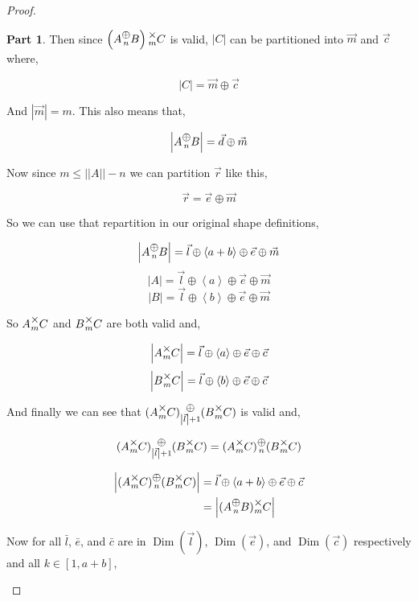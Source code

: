 \documentclass[12pt]{book}
\theoremstyle{plain}
\theoremstyle{definition}
\theoremstyle{ppart}
\newtheorem{ppart}{Part}
\theoremstyle{case}
\theoremstyle{solution}
\DeclareMathOperator{\Dim}{Dim}
\newcommand{\mmult}[1]{\text{\raisebox{1ex}{$\underset{#1}{\times}$}}}
\newcommand{\mconcat}[1]{\text{\raisebox{1ex}{$\underset{#1}{\oplus}$}}}
\newcommand{\shape}[1]{\left|#1\right|}
\begin{document}
\begin{proof}
\begin{ppart}
Then since $\left(A \mconcat{n} B\right) \mmult{m} C$ is valid, $\shape{C}$ can
be partitioned into $\vec{m}$ and $\vec{c}$ where,

\[ \shape{C} = \vec{m} \oplus \vec{c} \]

And $\shape{\vec{m}} = m$. This also means that,

\[ \shape{A \mconcat{n} B} = \vec{d} \oplus \vec{m} \]

Now since $m \le \shape{\shape{A}}-n$ we can partition $\vec{r}$ like this,

\[ \vec{r} = \vec{e} \oplus \vec{m} \]

So we can use that repartition in our original shape definitions,

\[ \shape{A \mconcat{n} B} = \vec{l} \oplus \left<a+b\right> \oplus \vec{e} \oplus \vec{m} \]
\[ \shape{A} = \vec{l} \oplus \left<a\right> \oplus \vec{e} \oplus \vec{m} \]
\[ \shape{B} = \vec{l} \oplus \left<b\right> \oplus \vec{e} \oplus \vec{m} \]

So $A \mmult{m} C$ and $B \mmult{m} C$ are both valid and,

\[ \shape{A \mmult{m} C} = \vec{l} \oplus \left<a\right> \oplus \vec{e} \oplus \vec{c} \]
\[ \shape{B \mmult{m} C} = \vec{l} \oplus \left<b\right> \oplus \vec{e} \oplus \vec{c} \]

And finally we can see that $(A \mmult{m} C) \mconcat{\shape{\vec{l}}+1} (B \mmult{m} C)$
is valid and,

\[
  (A \mmult{m} C) \mconcat{\shape{\vec{l}}+1} (B \mmult{m} C)
  =
  (A \mmult{m} C) \mconcat{n} (B \mmult{m} C)
\]

\begin{align*}
  \shape{(A \mmult{m} C) \mconcat{n} (B \mmult{m} C)}
  &= \vec{l} \oplus \left<a+b\right> \oplus \vec{e} \oplus \vec{c} \\
  &= \shape{(A \mconcat{n} B) \mmult{m} C}
\end{align*}

\begin{landscape}
Now for all $\bar{l}$, $\bar{e}$, and $\bar{c}$ are in $\Dim(\vec{l})$, $\Dim(\vec{e})$,
and $\Dim(\vec{c})$ respectively and all $k \in [1,a+b]$,


\end{landscape}
\end{ppart}
\end{proof}
\end{document}
